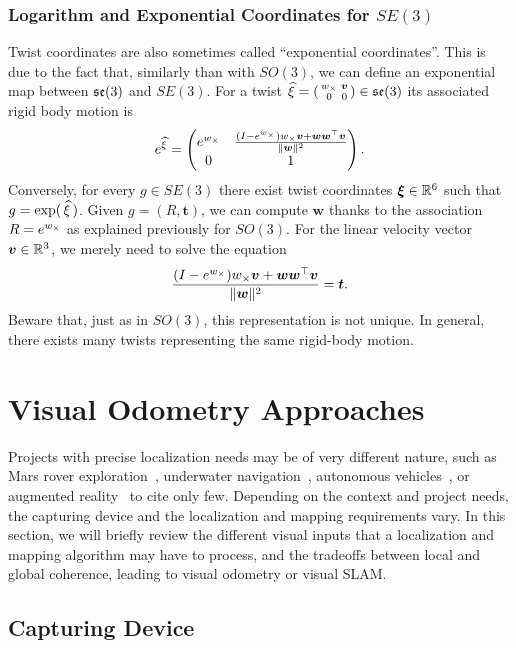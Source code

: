 \subsubsection{Logarithm and Exponential Coordinates for $SE(3)$}%
\label{ssub:exponential_coordinates_for_se_3}

Twist coordinates are also sometimes called ``exponential coordinates''.
This is due to the fact that, similarly than with $SO(3)$,
we can define an exponential map between $\mathfrak{se}(3)$ and $SE(3)$.
For a twist $\widehat{\xi} = \left(\begin{smallmatrix} {w}_{\times} & \bm{v} \\0 & 0 \end{smallmatrix} \right) \in \mathfrak{se}(3)$
its associated rigid body motion is
\[
	e^{\widehat{\xi}} =
	\begin{pmatrix}
		e^{{w}_{\times}}
			& \frac{(I-e^{{w}_{\times}}) {w}_{\times} \bm{v}
				+ \bm{w}\bm{w}^{\top}\bm{v}}{\|\bm{w}\|^2}
			\\
		0 & 1
	\end{pmatrix}.
\]
Conversely, for every $g \in SE(3)$ there exist
twist coordinates $\bm{\xi} \in \mathbb{R}^6$ such that $g=\exp(\,\widehat{\xi}\,)$.
Given $g = (R,\bm{t})$, we can compute $\bm{w}$ thanks to the association
$R = e^{{w}_{\times}}$ as explained previously for $SO(3)$.
For the linear velocity vector $\bm{v} \in \mathbb{R}^3$,
we merely need to solve the equation
\[
	\frac{(I-e^{{w}_{\times}}) {w}_{\times} \bm{v}
		+ \bm{w}\bm{w}^{\top}\bm{v}}{\|\bm{w}\|^2}
	= \bm{t}.
\]
Beware that, just as in $SO(3)$, this representation is not unique.
In general, there exists many twists representing the same rigid-body motion.


\section{Visual Odometry Approaches}%
\label{sec:visual-odometry-approaches}

Projects with precise localization needs may be of very different nature,
such as Mars rover exploration~\cite{maimone2007two},
underwater navigation~\cite{dunbabin2005hybrid},
autonomous vehicles~\cite{bertozzi2011viac},
or augmented reality~\cite{schops2014semi} to cite only few.
Depending on the context and project needs,
the capturing device and the localization and mapping requirements vary.
In this section, we will briefly review the different visual inputs
that a localization and mapping algorithm may have to process,
and the tradeoffs between local and global coherence,
leading to visual odometry or visual SLAM.\@

\subsection{Capturing Device}%
\label{sub:capturing-device}

